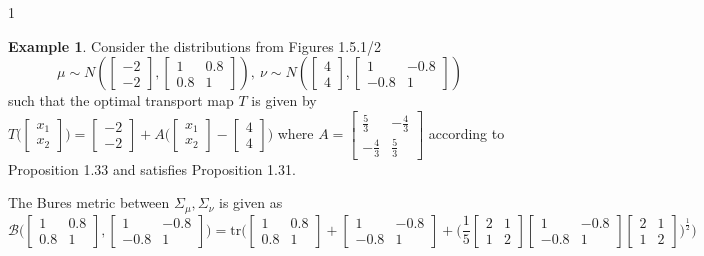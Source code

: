 \documentclass[12pt]{article}
\theoremstyle{definition}
\newtheorem*{example}{Example}
\theoremstyle{plain}
\begin{document}
\begin{spacing}{1}
\begin{example} Consider the distributions from Figures 1.5.1/2
\[
\mu \sim N(\begin{bmatrix}
    -2 \\
    -2
\end{bmatrix}, \begin{bmatrix}
1 & 0.8 \\
0.8 & 1
\end{bmatrix}), \ \nu \sim N(\begin{bmatrix}
    4 \\
    4
\end{bmatrix}, \begin{bmatrix}
1 & -0.8 \\
-0.8 & 1
\end{bmatrix})
\]
such that the optimal transport map $T$ is given by $T \bigg (\begin{bmatrix}
    x_1 \\
    x_2
\end{bmatrix} \bigg ) = \begin{bmatrix}
    -2 \\
    -2
\end{bmatrix} + A \bigg (\begin{bmatrix}
    x_1 \\
    x_2
\end{bmatrix} - \begin{bmatrix}
    4\\
    4
\end{bmatrix} \bigg )$
where $A = \begin{bmatrix}
    \frac{5}{3} & -\frac{4}{3}\\
    -\frac{4}{3} & \frac{5}{3}
\end{bmatrix}$
according to Proposition 1.33 and satisfies Proposition 1.31.

\bigskip

The Bures metric between $\Sigma_\mu, \Sigma_\nu$ is given as
\[
\mathcal{B} \bigg (\begin{bmatrix}
1 & 0.8 \\
0.8 & 1
\end{bmatrix}, \begin{bmatrix}
1 & -0.8 \\
-0.8 & 1
\end{bmatrix} \bigg ) = \text{tr} \bigg( \begin{bmatrix}
1 & 0.8 \\
0.8 & 1
\end{bmatrix} + \begin{bmatrix}
1 & -0.8 \\
-0.8 & 1
\end{bmatrix} + \bigg( \frac{1}{5} \begin{bmatrix}
2 & 1 \\
1 & 2
\end{bmatrix} \begin{bmatrix}
1 & -0.8 \\
-0.8 & 1
\end{bmatrix} \begin{bmatrix}
2 & 1 \\
1 & 2
\end{bmatrix} \bigg)^\frac{1}{2} \bigg)
\]


\end{example}
\end{spacing}
\end{document}
